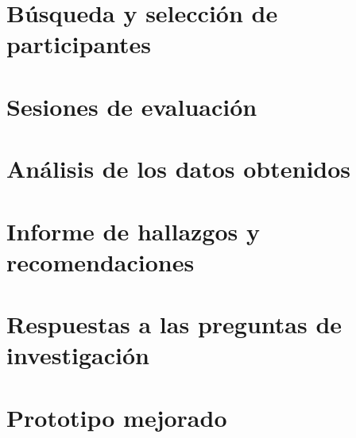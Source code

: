 




\section{Búsqueda y selección de participantes}

\section{Sesiones de evaluación}

\section{Análisis de los datos obtenidos}

\section{Informe de hallazgos y recomendaciones}

\section{Respuestas a las preguntas de investigación}

\section{Prototipo mejorado}